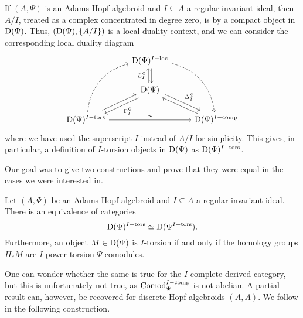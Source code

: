 \begin{construction}
    \label{ch0:const:local-duality-hopf-algebroid}
    If $(A, \Psi)$ is an Adams Hopf algebroid and $I\subseteq A$ a regular invariant ideal, then $A/I$, treated as a complex concentrated in degree zero, is by \cite[5.13]{barthel-heard-valenzuela_2018} a compact object in $\mathrm{D}(\Psi)$. Thus, $(\mathrm{D}(\Psi), \{A/I\})$ is a local duality context, and we can consider the corresponding local duality diagram
    \begin{equation*}
        \begin{tikzcd}
            & {\Der(\Psi)\Iloc} \\
            & {\Der(\Psi)} \\
            {\Der(\Psi)\Itors} && {\Der(\Psi)\Icomp}
            \arrow["L_I^\Psi", xshift=-2pt, from=2-2, to=1-2]
            \arrow[xshift=2pt, from=1-2, to=2-2]
            \arrow["\Delta_I^\Psi", yshift=2pt, xshift=2pt, from=2-2, to=3-3]
            \arrow[yshift=-2pt, xshift=-1pt, from=3-3, to=2-2]
            \arrow["\Gamma^\Psi_I", yshift=-2pt, xshift=2pt, from=2-2, to=3-1]
            \arrow[yshift=2pt, xshift=-1pt, from=3-1, to=2-2]
            \arrow[bend left=35, dashed, from=3-1, to=1-2]
            \arrow[bend left=35, dashed, from=1-2, to=3-3]
            \arrow["\simeq"', swap, from=3-1, to=3-3]
        \end{tikzcd}    
    \end{equation*}
    where we have used the superscript $I$ instead of $A/I$ for simplicity. This gives, in particular, a definition of $I$-torsion objects in $\mathrm{D}(\Psi)$ as $\mathrm{D}(\Psi)^{I-\mathrm{tors}}$. 
\end{construction}

Our goal was to give two constructions and prove that they were equal in the cases we were interested in. 

\begin{lemma}
    \label{ch0:lm:derived-torsion-if-homology-torsion}
    Let $(A,\Psi)$ be an Adams Hopf algebroid and $I\subseteq A$ a regular invariant ideal. There is an equivalence of categories 
    \[\mathrm{D}(\Psi)^{I-\mathrm{tors}}\simeq \mathrm{D}(\Psi^{I-\mathrm{tors}}).\] 
    Furthermore, an object $M\in \mathrm{D}(\Psi)$ is $I$-torsion if and only if the homology groups $H_* M$ are $I$-power torsion $\Psi$-comodules.
\end{lemma}

One can wonder whether the same is true for the $I$-complete derived category, but this is unfortunately not true, as $\mathrm{Comod}_\Psi^{I-\mathrm{comp}}$ is not abelian. A partial result can, however, be recovered for discrete Hopf algebroids $(A, A)$. We follow \cite{barthel-heard-valenzuela_2020} in the following construction. 

